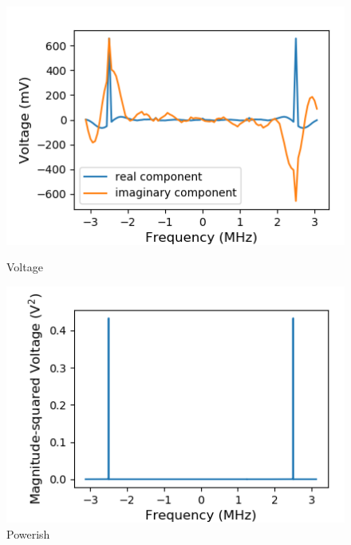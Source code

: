 \documentclass[a4paper]{article}
\begin{document}
\begin{figure}
\centering
\begin{minipage}{.5\textwidth}
	\centering
	\includegraphics[width=.8\linewidth]{5-3/volt2}
	\caption{Voltage}
	\label{fig:Volt2}
\end{minipage}%
\begin{minipage}{.5\textwidth}
	\centering
	\includegraphics[width=.8\linewidth]{5-3/pow2}
	\caption{Powerish}
	\label{fig:SyPw2}
\end{minipage}
\end{figure}
\end{document}
